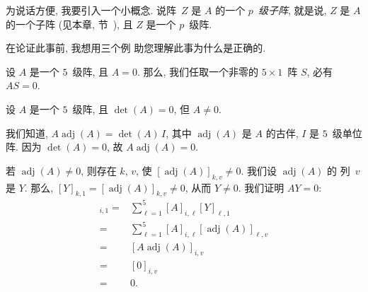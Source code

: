 为说话方便, 我要引入一个小概念.
说阵~\(Z\) 是 \(A\) 的一个 \emph{\(p\)~级子阵},
就是说, \(Z\) 是 \(A\) 的一个子阵
(见本章, 节~),
且 \(Z\) 是一个 \(p\)~级阵.

在论证此事前, 我想用三个例%
助您理解此事为什么是正确的.

\begin{example}
    设 \(A\) 是一个 \(5\)~级阵,
    且 \(A = 0\).
    那么, 我们任取一个非零的 \(5 \times 1\)~阵 \(S\),
    必有 \(AS = 0\).
\end{example}

\begin{example}
    设 \(A\) 是一个 \(5\)~级阵,
    且 \(\det {(A)} = 0\),
    但 \(A \neq 0\).

    我们知道,
    \(A \operatorname{adj} {(A)} = \det {(A)}\, I\),
    其中 \(\operatorname{adj} {(A)}\)
    是 \(A\) 的古伴,
    \(I\) 是 \(5\)~级单位阵.
    因为 \(\det {(A)} = 0\),
    故 \(A \operatorname{adj} {(A)} = 0\).

    若 \(\operatorname{adj} {(A)} \neq 0\),
    则存在 \(k\), \(v\), 使
    \([\operatorname{adj} {(A)}]_{k,v} \neq 0\).
    我们设 \(\operatorname{adj} {(A)}\) 的%
    列~\(v\) 是 \(Y\).
    那么, \([Y]_{k,1}
        = [\operatorname{adj} {(A)}]_{k,v} \neq 0\),
    从而 \(Y \neq 0\).
    我们证明 \(AY = 0\):
    \begin{align*}
        [AY]_{i,1}
        = {} &
        \sum_{\ell = 1}^{5}
        {[A]_{i,\ell} [Y]_{\ell,1}}
        \\
        = {} &
        \sum_{\ell = 1}^{5}
        {[A]_{i,\ell} [\operatorname{adj} {(A)}]_{\ell,v}}
        \\
        = {} &
        [A \operatorname{adj} {(A)}]_{i,v}
        \\
        = {} &
        [0]_{i,v}
        \\
        = {} &
        0.
    \end{align*}
\end{example}

